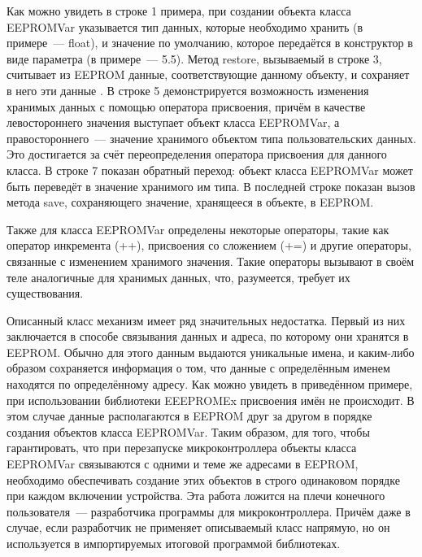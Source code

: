 



Как можно увидеть в строке 1 примера, при создании объекта класса EEPROMVar указывается тип данных, которые необходимо хранить (в примере~--- float), и значение по умолчанию, которое передаётся в конструктор в виде параметра (в примере~--- 5.5).
Метод restore, вызываемый в строке 3, считывает из EEPROM данные, соответствующие данному объекту, и сохраняет в него эти данные .
В строке 5 демонстрируется возможность изменения хранимых данных с помощью оператора присвоения, причём в качестве левостороннего значения выступает объект класса EEPROMVar, а правостороннего~--- значение хранимого объектом типа пользовательских данных.
Это достигается за счёт переопределения оператора присвоения для данного класса.
В строке 7 показан обратный переход: объект класса EEPROMVar может быть переведёт в значение хранимого им типа.
В последней строке показан вызов метода save, сохраняющего значение, хранящееся в объекте, в EEPROM.

Также для класса EEPROMVar определены некоторые операторы, такие как оператор инкремента (++), присвоения со сложением (+=) и другие операторы, связанные с изменением хранимого значения.
Такие операторы вызывают в своём теле аналогичные для хранимых данных, что, разумеется, требует их существования.

Описанный класс механизм имеет ряд значительных недостатка.
Первый из них заключается в способе связывания данных и адреса, по которому они хранятся в EEPROM.
Обычно для этого данным выдаются уникальные имена, и каким-либо образом сохраняется информация о том, что данные с определённым именем находятся по определённому адресу.
Как можно увидеть в приведённом примере, при использовании библиотеки EEEPROMEx присвоения имён не происходит.
В этом случае данные располагаются в EEPROM друг за другом в порядке создания объектов класса EEPROMVar.
Таким образом, для того, чтобы гарантировать, что при перезапуске микроконтроллера объекты класса EEPROMVar связываются с одними и теме же адресами в EEPROM, необходимо обеспечивать создание этих объектов в строго одинаковом порядке при каждом включении устройства.
Эта работа ложится на плечи конечного пользователя~--- разработчика программы для микроконтроллера.
Причём даже в случае, если разработчик не применяет описываемый класс напрямую, но он используется в импортируемых итоговой программой библиотеках.

